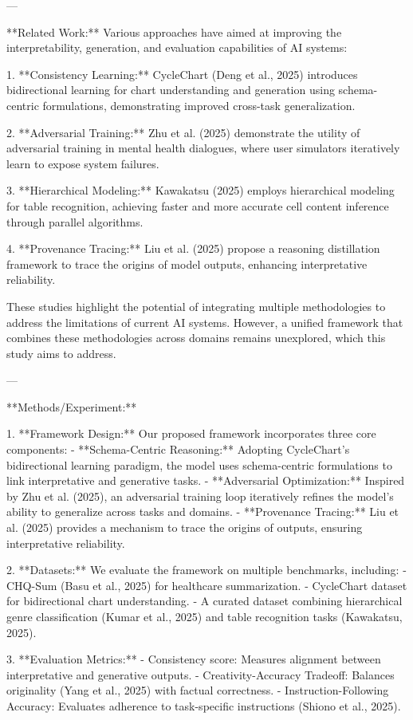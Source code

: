 ---

**Related Work:**  
Various approaches have aimed at improving the interpretability, generation, and evaluation capabilities of AI systems:

1. **Consistency Learning:** CycleChart (Deng et al., 2025) introduces bidirectional learning for chart understanding and generation using schema-centric formulations, demonstrating improved cross-task generalization.
   
2. **Adversarial Training:** Zhu et al. (2025) demonstrate the utility of adversarial training in mental health dialogues, where user simulators iteratively learn to expose system failures.
   
3. **Hierarchical Modeling:** Kawakatsu (2025) employs hierarchical modeling for table recognition, achieving faster and more accurate cell content inference through parallel algorithms.

4. **Provenance Tracing:** Liu et al. (2025) propose a reasoning distillation framework to trace the origins of model outputs, enhancing interpretative reliability.

These studies highlight the potential of integrating multiple methodologies to address the limitations of current AI systems. However, a unified framework that combines these methodologies across domains remains unexplored, which this study aims to address.

---

**Methods/Experiment:**  

1. **Framework Design:**  
   Our proposed framework incorporates three core components:  
   - **Schema-Centric Reasoning:** Adopting CycleChart’s bidirectional learning paradigm, the model uses schema-centric formulations to link interpretative and generative tasks.  
   - **Adversarial Optimization:** Inspired by Zhu et al. (2025), an adversarial training loop iteratively refines the model’s ability to generalize across tasks and domains.  
   - **Provenance Tracing:** Liu et al. (2025) provides a mechanism to trace the origins of outputs, ensuring interpretative reliability.

2. **Datasets:**  
   We evaluate the framework on multiple benchmarks, including:
   - CHQ-Sum (Basu et al., 2025) for healthcare summarization.
   - CycleChart dataset for bidirectional chart understanding.
   - A curated dataset combining hierarchical genre classification (Kumar et al., 2025) and table recognition tasks (Kawakatsu, 2025).

3. **Evaluation Metrics:**  
   - Consistency score: Measures alignment between interpretative and generative outputs.  
   - Creativity-Accuracy Tradeoff: Balances originality (Yang et al., 2025) with factual correctness.  
   - Instruction-Following Accuracy: Evaluates adherence to task-specific instructions (Shiono et al., 2025).

